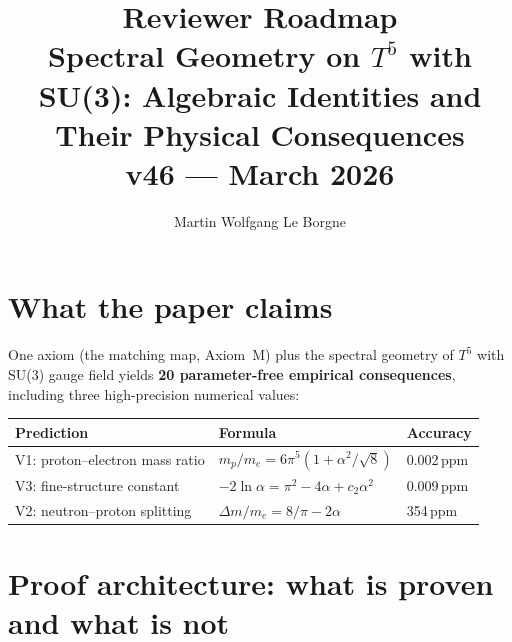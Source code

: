 \documentclass[11pt,a4paper]{article}
\title{\vspace{-2em}\textbf{Reviewer Roadmap}\\[0.3em]
\large Spectral Geometry on $T^5$ with SU(3): Algebraic Identities and Their Physical Consequences\\[0.2em]
\normalsize v46 --- March 2026}
\author{Martin Wolfgang Le Borgne}
\date{}
\begin{document}
\maketitle\thispagestyle{fancy}\vspace{-2em}

\section*{What the paper claims}

One axiom (the matching map, Axiom~M) plus the spectral geometry of
$T^5$ with SU(3) gauge field yields \textbf{20 parameter-free empirical consequences},
including three high-precision numerical values:
\begin{center}
\renewcommand{\arraystretch}{1.1}
\begin{tabular}{lll}
\toprule
\textbf{Prediction} & \textbf{Formula} & \textbf{Accuracy}\\
\midrule
V1: proton--electron mass ratio & $m_p/m_e = 6\pi^5(1+\alpha^2/\!\sqrt{8})$ & 0.002\,ppm\\
V3: fine-structure constant & $-2\ln\alpha = \pi^2-4\alpha+c_2\alpha^2$ & 0.009\,ppm\\
V2: neutron--proton splitting & $\Delta m/m_e = 8/\pi-2\alpha$ & 354\,ppm\\
\bottomrule
\end{tabular}
\end{center}

\section*{Proof architecture: what is proven and what is not}
\end{document}

